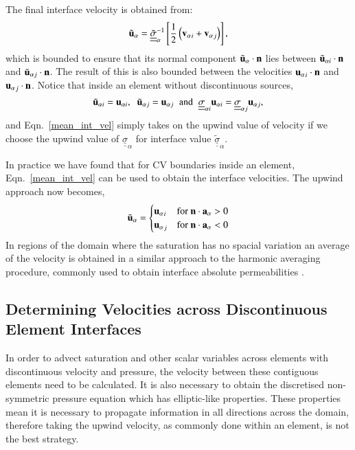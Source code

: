 \documentclass[preprint,authoryear,12pt]{elsarticle}
\begin{document}
The final interface velocity is obtained from:
\begin{equation}
  {\tilde{\bf u}_{\alpha}} = \underline{\underline{\tilde{\sigma}}}_{\alpha}^{-1} \left[\displaystyle\frac{1}{2} \left(    {{\bf v}_\alpha}_i +  {{\bf v}_\alpha}_j \right)\right],
  \label{mean_int_vel}  
\end{equation} 
which is bounded to ensure that its normal component ${\tilde{\bf u}_\alpha}\cdot {\bf n}$ lies between ${\tilde{\bf u}_{\alpha i}}\cdot {\bf n}$ and ${\tilde{\bf u}_{\alpha j}}\cdot {\bf n}$. The result of this is also bounded between the velocities ${{\bf u}_\alpha}_i\cdot {\bf n}$ and ${{\bf u}_\alpha}_j\cdot {\bf n}$. Notice that inside an element without discontinuous sources,
\begin{displaymath}
\tilde{\bf u}_{\alpha i} = {\bf u}_{\alpha i}, \;\; \tilde{\bf u}_{\alpha j} = {\bf u}_{\alpha j} \;\;\text{and}\;\; \underline{\underline{\sigma}}_{\alpha i} {\bf u}_{\alpha i} = \underline{\underline{\sigma}}_{\alpha j} {\bf u}_{\alpha j},
\end{displaymath}
and Eqn.~\ref{mean_int_vel} simply takes on the upwind value of velocity if we choose the upwind value of $\underline{\underline{\sigma}}_{\alpha}$ for interface value $\underline{\underline{\tilde{\sigma}}}_{\alpha}$.

In practice we have found that for CV boundaries inside an element, Eqn.~\ref{mean_int_vel} can be used to obtain the interface velocities. The upwind approach now becomes,
\begin{equation}
{\tilde{\bf u}_{\alpha}} =
\begin{cases}
{{\bf u}_{\alpha}}_{i} & \text{for }{\bf n}\cdot {\bf a}_{\alpha} > 0 \\
{{\bf u}_{\alpha}}_{j} & \text{for }{\bf n}\cdot {\bf a}_{\alpha} < 0 
\end{cases}
\end{equation}
In regions of the domain where the saturation has no spacial variation an average of the velocity is obtained in a similar approach to the harmonic averaging procedure, commonly used to obtain interface absolute permeabilities \citep{dake_1998,agelas_2009}.

\subsection{Determining Velocities across Discontinuous Element Interfaces}
In order to advect saturation and other scalar variables across elements with discontinuous velocity and pressure, the velocity between these contiguous elements need to be calculated. It is also necessary to obtain the discretised non-symmetric pressure equation which has elliptic-like properties. These properties mean it is necessary to propagate information in all directions across the domain, therefore taking the upwind velocity, as commonly done within an element, is not the best strategy.
 
\end{document}
